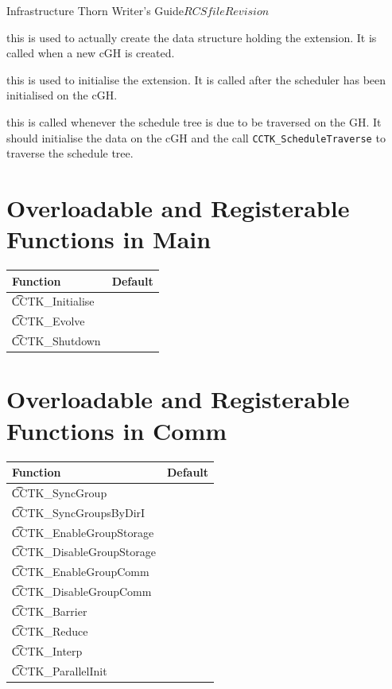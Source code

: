 \begin{cactuspart}{Infrastructure Thorn Writer's Guide}{$RCSfile$}{$Revision$}
\begin{Lentry}
\item[{\tt SetupGH}]
this is used to actually create the data structure holding the extension.  It
is called when a new cGH is created.
\item[{\tt InitGH}]
this is used to initialise the extension.  It is called after the scheduler has
been initialised on the cGH.
\item[{\tt ScheduleTraverseGH}]
this is called whenever the schedule tree is due to be traversed on the GH.  It
should initialise the data on the cGH and the call {\tt CCTK\_ScheduleTraverse} to traverse
the schedule tree.
\end{Lentry}

\chapter{Overloadable and Registerable Functions in Main}

 \begin{tabular}{|l|l|}
   \hline  {\bf Function} & {\bf Default} \\
   \hline {\t CCTK\_Initialise}           &\\
   \hline {\t CCTK\_Evolve}               &\\
   \hline {\t CCTK\_Shutdown}             &\\
   \hline
 \end{tabular}

\chapter{Overloadable and Registerable Functions in Comm}

  \begin{tabular}{|l|l|}
   \hline {\bf Function} & {\bf Default}  \\
   \hline {\t CCTK\_SyncGroup}           &\\
   \hline {\t CCTK\_SyncGroupsByDirI}    &\\
   \hline {\t CCTK\_EnableGroupStorage}  &\\
   \hline {\t CCTK\_DisableGroupStorage} &\\
   \hline {\t CCTK\_EnableGroupComm}     &\\
   \hline {\t CCTK\_DisableGroupComm}    &\\
   \hline {\t CCTK\_Barrier}             &\\
   \hline {\t CCTK\_Reduce}              &\\
   \hline {\t CCTK\_Interp}              &\\
   \hline {\t CCTK\_ParallelInit}        &\\
   \hline
  \end{tabular}


\end{cactuspart}
